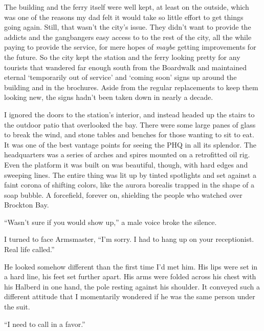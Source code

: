 The building and the ferry itself were well kept, at least on the outside, which was one of the reasons my dad felt it would take so little effort to get things going again.  Still, that wasn't the city's issue.  They didn't want to provide the addicts and the gangbangers easy access to to the rest of the city, all the while paying to provide the service, for mere hopes of \emph{maybe} getting improvements for the future.  So the city kept the station and the ferry looking pretty for any tourists that wandered far enough south from the Boardwalk and maintained eternal `temporarily out of service' and `coming soon' signs up around the building and in the brochures.  Aside from the regular replacements to keep them looking new, the signs hadn't been taken down in nearly a decade.



I ignored the doors to the station's interior, and instead headed up the stairs to the outdoor patio that overlooked the bay.  There were some large panes of glass to break the wind, and stone tables and benches for those wanting to sit to eat.  It was one of the best vantage points for seeing the PHQ in all its splendor.  The headquarters was a series of arches and spires mounted on a retrofitted oil rig.  Even the platform it was built on was beautiful, though, with hard edges and sweeping lines.  The entire thing was lit up by tinted spotlights and set against a faint corona of shifting colors, like the aurora borealis trapped in the shape of a soap bubble.  A forcefield, forever on, shielding the people who watched over Brockton Bay.



``Wasn't sure if you would show up,'' a male voice broke the silence.



I turned to face Armsmaster, ``I'm sorry.  I had to hang up on your receptionist.  Real life called.''



He looked somehow different than the first time I'd met him.  His lips were set in a hard line, his feet set further apart.  His arms were folded across his chest with his Halberd in one hand, the pole resting against his shoulder.  It conveyed such a different attitude that I momentarily wondered if he was the same person under the suit.



``I need to call in a favor.''





